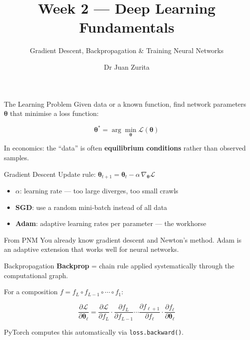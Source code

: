 \documentclass[aspectratio=169, 10pt]{beamer}
\title{Week 2 --- Deep Learning Fundamentals}
\subtitle{Gradient Descent, Backpropagation \& Training Neural Networks}
\author{Dr Juan Zurita}
\institute{Deep Learning for Macroeconomics\\
The University of Edinburgh~$\cdot$~School of Economics}
\date{}
\begin{document}
\maketitle

\begin{frame}{The Learning Problem}
Given data or a known function, find network parameters $\boldsymbol{\theta}$ that minimise a \alert{loss function}:

$$\boldsymbol{\theta}^* = \arg\min_{\boldsymbol{\theta}} \mathcal{L}(\boldsymbol{\theta})$$

\bigskip
In economics: the ``data'' is often \textbf{equilibrium conditions} rather than observed samples.
\end{frame}

\begin{frame}{Gradient Descent}
Update rule: $\boldsymbol{\theta}_{t+1} = \boldsymbol{\theta}_t - \alpha\,\nabla_{\boldsymbol{\theta}}\mathcal{L}$

\bigskip
\begin{itemize}
\item $\alpha$: learning rate --- too large diverges, too small crawls
\item \textbf{SGD}: use a random mini-batch instead of all data
\item \textbf{Adam}: adaptive learning rates per parameter --- the workhorse
\end{itemize}

\bigskip
\begin{block}{From PNM}
You already know gradient descent and Newton's method. Adam is an adaptive extension that works well for neural networks.
\end{block}
\end{frame}

\begin{frame}{Backpropagation}
\textbf{Backprop} = chain rule applied systematically through the computational graph.

\bigskip
For a composition $f = f_L \circ f_{L-1} \circ \cdots \circ f_1$:

$$\frac{\partial \mathcal{L}}{\partial \boldsymbol{\theta}_\ell} = \frac{\partial \mathcal{L}}{\partial f_L} \cdot \frac{\partial f_L}{\partial f_{L-1}} \cdots \frac{\partial f_{\ell+1}}{\partial f_\ell} \cdot \frac{\partial f_\ell}{\partial \boldsymbol{\theta}_\ell}$$

\bigskip
PyTorch computes this automatically via \texttt{loss.backward()}.
\end{frame}
\end{document}

